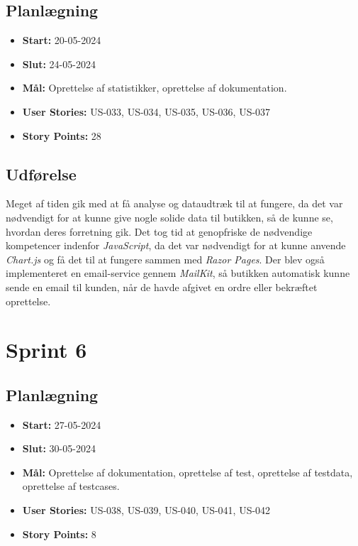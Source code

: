 \subsection{Planlægning}
\label{subsec:sprint-5-plan}
\begin{itemize}
    \item \textbf{Start:} 20-05-2024
    \item \textbf{Slut:} 24-05-2024
    \item \textbf{Mål:} Oprettelse af statistikker, oprettelse af dokumentation.
    \item \textbf{User Stories:} US-033, US-034, US-035, US-036, US-037
    \item \textbf{Story Points:} 28
\end{itemize}

\subsection{Udførelse}
\label{subsec:sprint-5-udforelse}
Meget af tiden gik med at få analyse og dataudtræk til at fungere, da det var nødvendigt for at kunne give nogle solide data til butikken, så de kunne se, hvordan deres forretning gik.
Det tog tid at genopfriske de nødvendige kompetencer indenfor \emph{JavaScript}, da det var nødvendigt for at kunne anvende \emph{Chart.js} og få det til at fungere sammen med \emph{Razor Pages}.
Der blev også implementeret en email-service gennem \emph{MailKit}, så butikken automatisk kunne sende en email til kunden, når de havde afgivet en ordre eller bekræftet oprettelse.

\section{Sprint 6}
\label{sec:sprint-6}
\subsection{Planlægning}
\label{subsec:sprint-6-plan}
\begin{itemize}
    \item \textbf{Start:} 27-05-2024
    \item \textbf{Slut:} 30-05-2024
    \item \textbf{Mål:} Oprettelse af dokumentation, oprettelse af test, oprettelse af testdata, oprettelse af testcases.
    \item \textbf{User Stories:} US-038, US-039, US-040, US-041, US-042
    \item \textbf{Story Points:} 8
\end{itemize}

